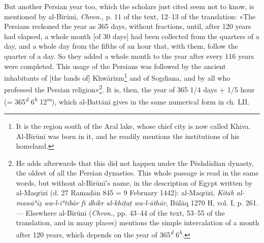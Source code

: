 \documentclass[11pt]{article}
\begin{document}
\par But another Persian year too, which the scholars just cited seem not to know, is mentioned by al-Bīrūnī, \emph{Chron.}, p. 11 of the text, 12–13 of the translation: «The Persians reckoned the year as 365 days, without fractions, until, after 120 years had elapsed, a whole month [of 30 days] had been collected from the quarters of a day, and a whole day from the fifths of an hour that, with them, follow the quarter of a day. So they added a whole month to the year after every 116 years were completed. This usage of the Persians was followed by the ancient inhabitants of [the lands of] Khwārizm\footnote{It is the region south of the Aral lake, whose chief city is now called Khiva. Al-Bīrūnī was born in it, and he readily mentions the institutions of his homeland.} and of Sogdiana, and by all who professed the Persian religion»\footnote{He adds afterwards that this did not happen under the Pēshdādian dynasty, the oldest of all the Persian dynasties. This whole passage is read in the same words, but without al-Bīrūnī's name, in the description of Egypt written by al-Maqrīzī (d. 27 Ramaḍān 845 = 9 February 1442): al-Maqrīzī, \emph{Kitāb al-mawāʿiẓ wa-l-iʿtibār fī dhikr al-khiṭaṭ wa-l-āthār}, Būlāq 1270 H, vol. I, p. 261. — Elsewhere al-Bīrūnī (\emph{Chron.}, pp. 43–44 of the text, 53–55 of the translation, and in many places) mentions the simple intercalation of a month after 120 years, which depends on the year of 365\textsuperscript{\itshape d} 6\textsuperscript{\itshape h}.}. It is, then, the year of 365 1/4 days + 1/5 hour (= 365\textsuperscript{\itshape d} 6\textsuperscript{\itshape h} 12\textsuperscript{\itshape m}), which al-Battānī gives in the same numerical form in ch. LII.\par
\end{document}
